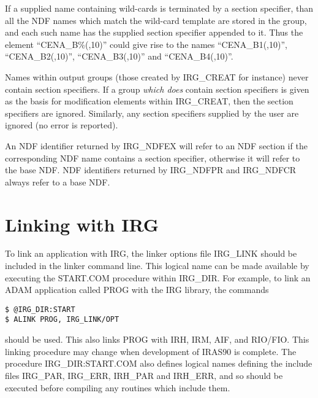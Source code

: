 If a supplied name containing wild-cards is terminated by a section specifier, 
than all the NDF names which match the wild-card template are stored in the 
group, and each such name has the supplied section specifier appended to it.
Thus the element ``CENA\_B\%(,10)'' could give rise to the names 
``CENA\_B1(,10)'', ``CENA\_B2(,10)'', ``CENA\_B3(,10)'' and ``CENA\_B4(,10)''.

Names within output groups (those created by IRG\_CREAT for instance) never
contain section specifiers. If a group {\em which does} contain section
specifiers is given as the basis for modification elements within IRG\_CREAT,
then the section specifiers are ignored. Similarly, any section specifiers
supplied by the user are ignored (no error is reported). 

An NDF identifier returned by IRG\_NDFEX will refer to an NDF section if the
corresponding NDF name contains a section specifier, otherwise it will refer to
the base NDF. NDF identifiers returned by IRG\_NDFPR and IRG\_NDFCR always refer
to a base NDF. 

\section {Linking with IRG}
To link an application with IRG, the linker options file IRG\_LINK should be
included in the linker command line. This logical name can be made available by
executing the START.COM procedure within IRG\_DIR. For example, to link an ADAM
application called PROG with the IRG library, the commands 

\begin{verbatim}
$ @IRG_DIR:START
$ ALINK PROG, IRG_LINK/OPT 
\end{verbatim}

should be used. This also links PROG with IRH, IRM, AIF, and RIO/FIO.
This linking procedure may change when development of IRAS90 is complete. The
procedure IRG\_DIR:START.COM also defines logical names defining the include
files IRG\_PAR, IRG\_ERR, IRH\_PAR and IRH\_ERR, and so should be executed
before compiling any routines which include them. 

\appendix

\newcommand{\noteroutine}[2]{{\small \bf #1} \\
                              \hspace*{3em} {\em #2} \\[1.5ex]}

